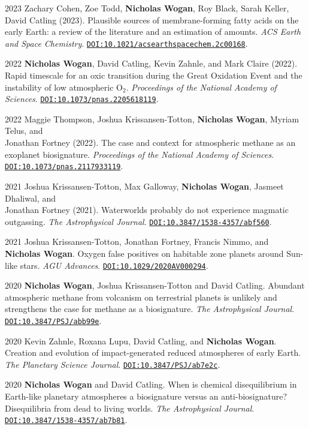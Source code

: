 \documentclass{article}
\begin{document}
\begin{cvlist}
\item[2023]
  Zachary Cohen, Zoe Todd, \textbf{Nicholas Wogan}, Roy Black, Sarah Keller, David Catling (2023). Plausible sources of membrane-forming fatty acids on the early Earth: a review of the literature and an estimation of amounts. \emph{ACS Earth and Space Chemistry}. \href{https://doi.org/10.1021/acsearthspacechem.2c00168}{\nolinkurl{DOI:10.1021/acsearthspacechem.2c00168}}.
\item[2022]
  \textbf{Nicholas Wogan}, David Catling, Kevin Zahnle, and Mark Claire (2022). Rapid timescale for an oxic transition during the Great Oxidation Event and the instability of low atmospheric O$_2$. \emph{Proceedings of the National Academy of Sciences}. \href{https://doi.org/10.1073/pnas.2205618119}{\nolinkurl{DOI:10.1073/pnas.2205618119}}.
\item[2022]
  Maggie Thompson, Joshua Krissansen-Totton, \textbf{Nicholas Wogan}, Myriam Telus, and \\Jonathan Fortney (2022). The case and context for atmospheric methane as an exoplanet biosignature. \emph{Proceedings of the National Academy of Sciences}. \href{https://doi.org/10.1073/pnas.2117933119}{\nolinkurl{DOI:10.1073/pnas.2117933119}}.
\item[2021]
  Joshua Krissansen-Totton, Max Galloway, \textbf{Nicholas Wogan}, Jasmeet Dhaliwal, and \\Jonathan Fortney (2021). Waterworlds probably do not experience magmatic outgassing. \emph{The Astrophysical Journal}. \href{https://doi.org/10.3847/1538-4357/abf560}{\nolinkurl{DOI:10.3847/1538-4357/abf560}}.
\item[2021]
  Joshua Krissansen-Totton, Jonathan Fortney, Francis Nimmo, and \textbf{Nicholas Wogan}. Oxygen false positives on habitable zone planets around Sun-like stars. \emph{AGU Advances}. \href{https://doi.org/10.1029/2020AV000294}{\nolinkurl{DOI:10.1029/2020AV000294}}.
\item[2020]
  \textbf{Nicholas Wogan}, Joshua Krissansen-Totton and David Catling. Abundant atmospheric methane from volcanism on terrestrial planets is unlikely and strengthens the case for methane as a biosignature. \emph{The Astrophysical Journal}. \href{https://doi.org/10.3847/PSJ/abb99e}{\nolinkurl{DOI:10.3847/PSJ/abb99e}}.
\item[2020]
  Kevin Zahnle, Roxana Lupu, David Catling, and \textbf{Nicholas Wogan}. Creation and evolution of impact-generated reduced atmospheres of early Earth. \emph{The Planetary Science Journal}. \href{https://doi.org/10.3847/PSJ/ab7e2c}{\nolinkurl{DOI:10.3847/PSJ/ab7e2c}}.
\item[2020]
  \textbf{Nicholas Wogan} and David Catling. When is chemical disequilibrium in Earth-like planetary atmospheres a biosignature versus an anti-biosignature? Disequilibria from dead to living worlds. \emph{The Astrophysical Journal}. \href{https://doi.org/10.3847/1538-4357/ab7b81}{\nolinkurl{DOI:10.3847/1538-4357/ab7b81}}.
\end{cvlist}
\end{document}
